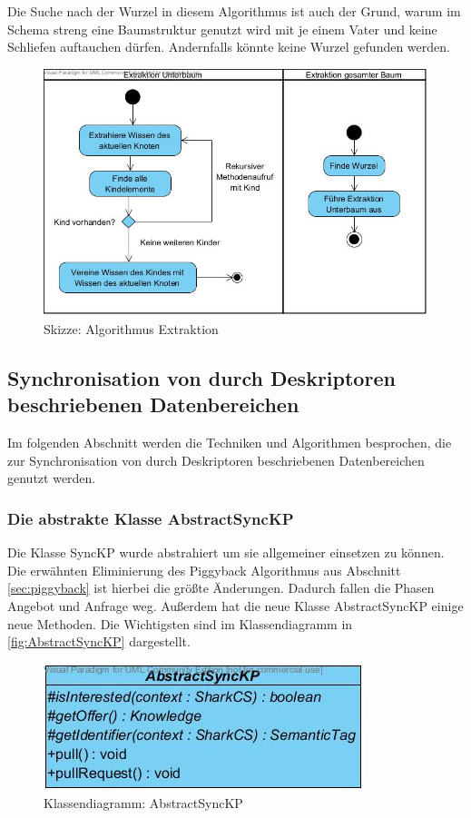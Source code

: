 \documentclass[a4paper]{article}
\begin{document}
	Die Suche nach der Wurzel in diesem Algorithmus ist auch der Grund, warum
	im Schema streng eine Baumstruktur genutzt wird mit je einem Vater und keine
	Schliefen auftauchen dürfen. Andernfalls könnte keine Wurzel gefunden werden.
	
	\begin{figure}[H]
		\includegraphics[width=\linewidth]{../Bilder/extraction.jpg}
		\caption{Skizze: Algorithmus Extraktion}
		\label{fig:extraction}
	\end{figure}	
	
	\subsection{Synchronisation von durch Deskriptoren beschriebenen Datenbereichen}	
	
	Im folgenden Abschnitt werden die Techniken und Algorithmen besprochen, die
	zur Synchronisation von durch Deskriptoren beschriebenen Datenbereichen genutzt
	werden.
	
	\subsubsection{Die abstrakte Klasse AbstractSyncKP}
	
	Die Klasse SyncKP wurde abstrahiert um sie allgemeiner einsetzen zu können.
	Die erwähnten Eliminierung des Piggyback Algorithmus aus Abschnitt
	\ref{sec:piggyback} ist hierbei die größte Änderungen. Dadurch fallen die 
	Phasen Angebot und Anfrage weg. Außerdem hat die neue Klasse
	AbstractSyncKP einige neue Methoden. Die Wichtigsten sind im Klassendiagramm
	in \autoref{fig:AbstractSyncKP} dargestellt.
	
	\begin{figure}[H]
		\centerline{
			\includegraphics{../Bilder/AbstractSyncKP.jpg}
		}
		\caption{Klassendiagramm: AbstractSyncKP}
		\label{fig:AbstractSyncKP}
	\end{figure}	
	
\end{document}
